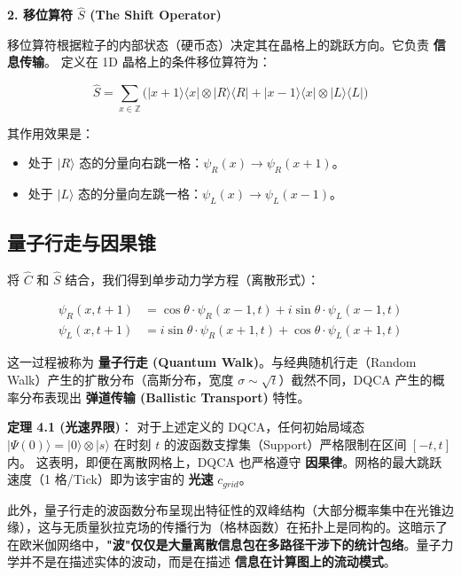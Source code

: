 \textbf{2. 移位算符 $\hat{S}$ (The Shift Operator)}

移位算符根据粒子的内部状态（硬币态）决定其在晶格上的跳跃方向。它负责 \textbf{信息传输}。
定义在 1D 晶格上的条件移位算符为：

\[\hat{S} = \sum_{x \in \mathbb{Z}} \Big( |x+1\rangle\langle x| \otimes |R\rangle\langle R| + |x-1\rangle\langle x| \otimes |L\rangle\langle L| \Big)\]

其作用效果是：

\begin{itemize}
\item 处于 $|R\rangle$ 态的分量向右跳一格：$\psi_R(x) \to \psi_R(x+1)$。
\item 处于 $|L\rangle$ 态的分量向左跳一格：$\psi_L(x) \to \psi_L(x-1)$。
\end{itemize}

\subsection{量子行走与因果锥}

将 $\hat{C}$ 和 $\hat{S}$ 结合，我们得到单步动力学方程（离散形式）：

\[\begin{aligned} \psi_R(x, t+1) &= \cos\theta \cdot \psi_R(x-1, t) + i \sin\theta \cdot \psi_L(x-1, t) \\ \psi_L(x, t+1) &= i \sin\theta \cdot \psi_R(x+1, t) + \cos\theta \cdot \psi_L(x+1, t) \end{aligned}\]

这一过程被称为 \textbf{量子行走 (Quantum Walk)}。与经典随机行走（Random Walk）产生的扩散分布（高斯分布，宽度 $\sigma \sim \sqrt{t}$）截然不同，DQCA 产生的概率分布表现出 \textbf{弹道传输 (Ballistic Transport)} 特性。

\textbf{定理 4.1 (光速界限)}：
对于上述定义的 DQCA，任何初始局域态 $|\Psi(0)\rangle = |0\rangle \otimes |s\rangle$ 在时刻 $t$ 的波函数支撑集（Support）严格限制在区间 $[-t, t]$ 内。
这表明，即便在离散网格上，DQCA 也严格遵守 \textbf{因果律}。网格的最大跳跃速度（1 格/Tick）即为该宇宙的 \textbf{光速} $c_{grid}$。

此外，量子行走的波函数分布呈现出特征性的双峰结构（大部分概率集中在光锥边缘），这与无质量狄拉克场的传播行为（格林函数）在拓扑上是同构的。这暗示了在欧米伽网络中，\textbf{"波"仅仅是大量离散信息包在多路径干涉下的统计包络}。量子力学并不是在描述实体的波动，而是在描述 \textbf{信息在计算图上的流动模式}。
